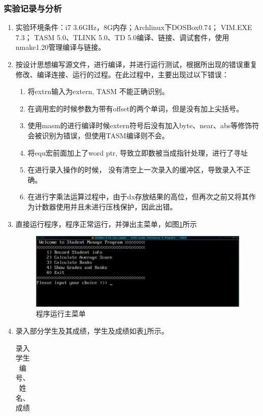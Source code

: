 \documentclass{article}
\begin{document}
	\subsubsection{实验记录与分析}

	\begin{enumerate}
		\item 实验环境条件：i7 3.6GHz，8G内存；Archlinux下DOSBox0.74； VIM.EXE 7.3； TASM 5.0、TLINK 5.0、TD 5.0编译、链接、调试套件，使用nmake1.20管理编译与链接。
		\item 按设计思想编写源文件，进行编译，并进行运行测试，根据所出现的错误重复修改、编译连接、运行的过程。在此过程中，主要出现过以下错误：
			\begin{enumerate}
				\item 将extrn输入为extern, TASM 不能正确识别。
				\item 在调用宏的时候参数为带有offset的两个单词，但是没有加上尖括号。
				\item 使用masm的进行编译时候extern符号后没有加入byte、near、abs等修饰符会被识别为错误，但使用TASM编译则不会。
				\item 将equ宏前面加上了word ptr, 导致立即数被当成指针处理，进行了寻址
				\item 在进行录入操作的时候， 没有清空上一次录入的缓冲区，导致录入不正确。
				\item 在进行字乘法运算过程中，由于dx存放结果的高位，但再次之前又将其作为计数器使用并且未进行压栈保护，因此出错。
			\end{enumerate}
		\item 直接运行程序，程序正常运行，并弹出主菜单，如图\ref{fig:mainmenu}所示
			\begin{figure}[H]
				\centering
				\includegraphics[width=0.8\linewidth]{res/homework_3/mainmenu.png}
				\caption{程序运行主菜单}
				\label{fig:mainmenu}
			\end{figure}
		\item 录入部分学生及其成绩，学生及成绩如表\ref{tab:studentinfo}所示。
			\begin{table}[H]
				\centering
				\caption{录入学生编号、姓名、成绩}
				\label{tab:studentinfo}
				\begin{tabular}{c l l l l c c}

\end{tabular}
\end{table}
\end{enumerate}
\end{document}
